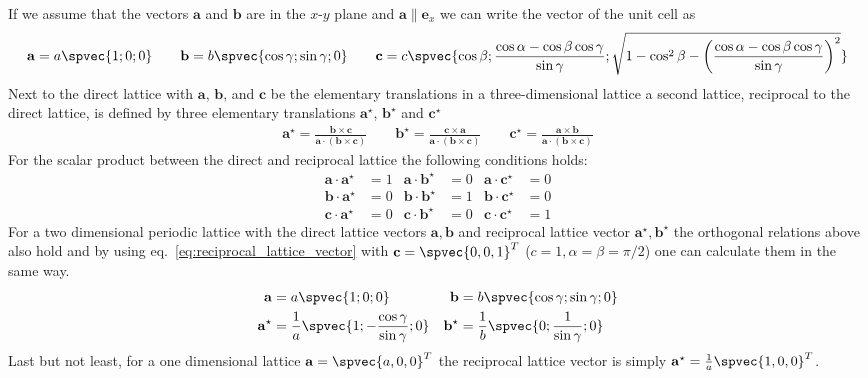 If we assume that the vectors $\mathbf{a}$ and $\mathbf{b}$ are in the $x$-$y$ plane and $\mathbf{a} \| \mathbf{e}_x$ we can write the vector of the unit cell as
\begin{align}
\label{eq:direct_lattice_vector}
\mathbf{a} = a \spvec{1;0;0}
\qquad
\mathbf{b} = b \spvec{\cos \gamma;\sin \gamma;0}
\qquad
\mathbf{c} = c \spvec{\cos\beta;\frac{\cos\alpha-\cos\beta \cos\gamma}{\sin\gamma};\sqrt{1-\cos^2\beta-\left(\frac{\cos\alpha-\cos\beta \cos\gamma}{\sin\gamma}\right)^2}}
\end{align}
Next to the direct lattice with $\mathbf{a}$, $\mathbf{b}$, and $\mathbf{c}$ be the elementary
translations in a three-dimensional lattice a second lattice, reciprocal to the direct lattice, is defined by three elementary translations $\mathbf{a}^\star$, $\mathbf{b}^\star$ and $\mathbf{c}^\star$
\begin{align}
\label{eq:reciprocal_lattice_vector}
\mathbf{a}^\star = \frac{\mathbf{b}\times\mathbf{c}}{\mathbf{a}\cdot (\mathbf{b}\times\mathbf{c})}
\qquad
\mathbf{b}^\star = \frac{\mathbf{c}\times\mathbf{a}}{\mathbf{a}\cdot (\mathbf{b}\times\mathbf{c})}
\qquad
\mathbf{c}^\star = \frac{\mathbf{a}\times\mathbf{b}}{\mathbf{a}\cdot (\mathbf{b}\times\mathbf{c})}
\end{align}
For the scalar product between the direct and reciprocal lattice the following conditions holds:
\begin{subequations}
\begin{align}
\mathbf{a}\cdot\mathbf{a}^\star&=1 & \mathbf{a}\cdot\mathbf{b}^\star&=0 & \mathbf{a}\cdot\mathbf{c}^\star&=0 \\
\mathbf{b}\cdot\mathbf{a}^\star&=0 & \mathbf{b}\cdot\mathbf{b}^\star&=1 & \mathbf{b}\cdot\mathbf{c}^\star&=0 \\
\mathbf{c}\cdot\mathbf{a}^\star&=0 & \mathbf{c}\cdot\mathbf{b}^\star&=0 & \mathbf{c}\cdot\mathbf{c}^\star&=1
\end{align}
\end{subequations}
For a two dimensional periodic lattice with the direct lattice vectors $\mathbf{a}, \mathbf{b}$ and reciprocal lattice vector $\mathbf{a}^\star, \mathbf{b}^\star$ the orthogonal relations above also hold and by using eq.\ \ref{eq:reciprocal_lattice_vector} with $\mathbf{c}=\spvec{0,0,1}^T$ ($c=1,\alpha=\beta=\pi/2$) one can calculate them in the same way.
\begin{subequations}
\begin{align}
\label{eq:2D_lattice_vector}
\mathbf{a} &= a \spvec{1;0;0}  & \mathbf{b} &= b \spvec{\cos \gamma;\sin \gamma;0} \\
\mathbf{a}^\star &= \frac{1}{a} \spvec{1;-\frac{\cos\gamma}{\sin\gamma};0} &  \mathbf{b}^\star &= \frac{1}{b} \spvec{0;\frac{1}{\sin \gamma};0}
\end{align}
\end{subequations}
Last but not least, for a one dimensional lattice $\mathbf{a}=\spvec{a,0,0}^T$ the reciprocal lattice vector is simply $\mathbf{a}^\star=\frac1a\spvec{1,0,0}^T$.

